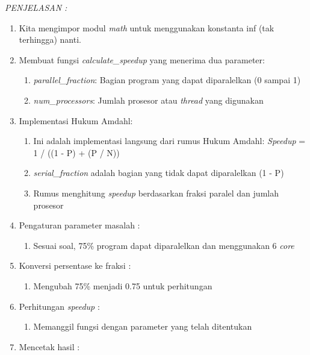 \documentclass[12pt]{article}
\begin{document}
\begin{enumerate}
    \textit{PENJELASAN : }
    \begin{enumerate}
        \item Kita mengimpor modul \textit{math} untuk menggunakan konstanta inf (tak terhingga) nanti.
        \item Membuat fungsi \textit{calculate\_speedup} yang menerima dua parameter:
            \begin{enumerate}
                \item \textit{parallel\_fraction}: Bagian program yang dapat diparalelkan (0 sampai 1)
                \item \textit{num\_processors}: Jumlah prosesor atau \textit{thread} yang digunakan
            \end{enumerate}
        \item Implementasi Hukum Amdahl:
            \begin{enumerate}
                \item Ini adalah implementasi langsung dari rumus Hukum Amdahl: \textit{Speedup} = 1 / ((1 - P) + (P / N))
                \item \textit{serial\_fraction} adalah bagian yang tidak dapat diparalelkan (1 - P)
                \item Rumus menghitung \textit{speedup} berdasarkan fraksi paralel dan jumlah prosesor
            \end{enumerate}
        \item Pengaturan parameter masalah :
            \begin{enumerate}
                \item Sesuai soal, 75\% program dapat diparalelkan dan menggunakan 6 \textit{core}
            \end{enumerate}
        \item Konversi persentase ke fraksi :
            \begin{enumerate}
                \item Mengubah 75\% menjadi 0.75 untuk perhitungan
            \end{enumerate}
        \item Perhitungan \textit{speedup} :
            \begin{enumerate}
                \item Memanggil fungsi dengan parameter yang telah ditentukan
            \end{enumerate}
        \item  Mencetak hasil :
            \begin{enumerate}

\end{enumerate}
\end{enumerate}
\end{enumerate}
\end{document}
